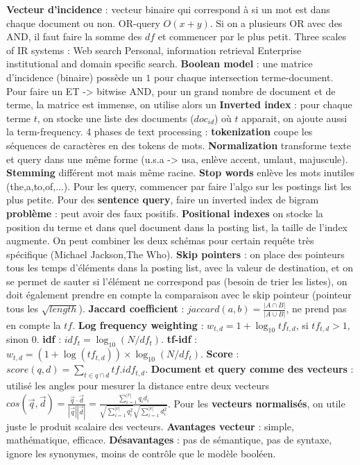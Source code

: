 \documentclass[9pt,a4paper]{report}
\begin{document}
\textbf{Vecteur d'incidence} : vecteur binaire qui correspond à si un mot est dans chaque document ou non. OR-query $O(x+y)$. Si on a plusieurs OR avec des AND, il faut faire la somme des $df$ et commencer par le plus petit. Three scales of IR systems : Web	search Personal, information retrieval Enterprise institutional and domain specific search. \textbf{Boolean model} : une matrice d'incidence (binaire) possède un $1$ pour chaque intersection terme-document. Pour faire un ET -> bitwise AND, pour un grand nombre de document et de terme, la matrice est immense, on utilise alors un \textbf{Inverted index} : pour chaque terme $t$, on stocke une liste des documents ($doc_{id}$) où $t$ apparait, on ajoute aussi la term-frequency. 4 phases de text processing : \textbf{tokenization} coupe les séquences de caractères en des tokens de mots. \textbf{Normalization} transforme texte et query dans une même forme (u.s.a -> usa, enlève accent, umlaut, majuscule). \textbf{Stemming} différent mot mais même racine. \textbf{Stop words} enlève les mots inutiles (the,a,to,of,...). Pour les query, commencer par faire l'algo sur les postings list les plus petite. Pour des \textbf{sentence query}, faire un inverted index de bigram \textbf{problème} : peut avoir des faux positifs. \textbf{Positional indexes} on stocke la position du terme et dans quel document dans la posting list, la taille de l'index augmente. On peut combiner les deux schémas pour certain requête très spécifique (Michael Jackson,The Who). \textbf{Skip pointers} : on place des pointeurs tous les temps d'éléments dans la posting list, avec la valeur de destination, et on se permet de sauter si l'élément ne correspond pas (besoin de trier les listes), on doit également prendre en compte la comparaison avec le skip pointeur (pointeur tous les $\sqrt{length}$). \textbf{Jaccard coefficient} : $jaccard(a,b)=\frac{|A \cap B|}{|A \cup B|}$, ne prend pas en compte la $tf$. \textbf{Log frequency weighting} : $w_{t,d}=1+\log_{10}tf_{t,d}$, si $tf_{t,d} > 1$, sinon $0$. \textbf{idf} : $idf_t=\log_{10}(N/df_t)$. \textbf{tf-idf} : $w_{t,d}=(1+\log(tf_{t,d}))\times \log_{10}(N/df_t)$. \textbf{Score} : $score(q,d)=\sum_{t\in q \cap d}tf.idf_{t,d}$. \textbf{Document et query comme des vecteurs} : utilisé les angles pour mesurer la distance entre deux vecteurs $cos(\vec{q},\vec{d})=\frac{\vec{q}\cdot \vec{d}}{|\vec{q}||\vec{d}|} = \frac{\sum_{i=1}^{|v|}q_id_i}{\sqrt{\sum_{i=1}^{|v|}q_i^2}\sqrt{\sum_{i=1}^{|v|}d_i^2}}$. Pour les \textbf{vecteurs normalisés}, on utile juste le produit scalaire des vecteurs. \textbf{Avantages vecteur} : simple, mathématique, efficace. \textbf{Désavantages} : pas de sémantique, pas de syntaxe, ignore les synonymes, moins de contrôle que le modèle booléen.
\end{document}
